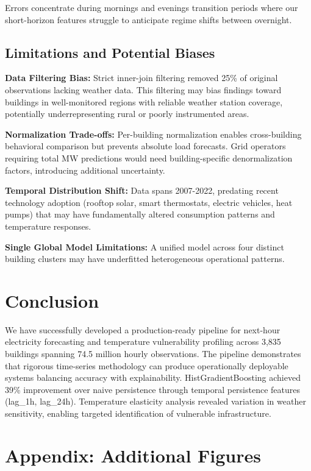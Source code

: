 \documentclass[11pt,a4paper]{article}
\begin{document}
Errors concentrate during mornings and evenings transition periods where our short-horizon features struggle to anticipate regime shifts between overnight.

\subsection{Limitations and Potential Biases}

\textbf{Data Filtering Bias:} Strict inner-join filtering removed 25\% of original observations lacking weather data. This filtering may bias findings toward buildings in well-monitored regions with reliable weather station coverage, potentially underrepresenting rural or poorly instrumented areas.

\textbf{Normalization Trade-offs:} Per-building normalization enables cross-building behavioral comparison but prevents absolute load forecasts. Grid operators requiring total MW predictions would need building-specific denormalization factors, introducing additional uncertainty.

\textbf{Temporal Distribution Shift:} Data spans 2007-2022, predating recent technology adoption (rooftop solar, smart thermostats, electric vehicles, heat pumps) that may have fundamentally altered consumption patterns and temperature responses.

\textbf{Single Global Model Limitations:} A unified model across four distinct building clusters may have underfitted heterogeneous operational patterns.

\section{Conclusion}

We have successfully developed a production-ready pipeline for next-hour electricity forecasting and temperature vulnerability profiling across 3,835 buildings spanning 74.5 million hourly observations. The pipeline demonstrates that rigorous time-series methodology can produce operationally deployable systems balancing accuracy with explainability. HistGradientBoosting achieved 39\% improvement over naive persistence through temporal persistence features (lag\_1h, lag\_24h). Temperature elasticity analysis revealed variation in weather sensitivity, enabling targeted identification of vulnerable infrastructure.

\section*{Appendix: Additional Figures}
\end{document}
